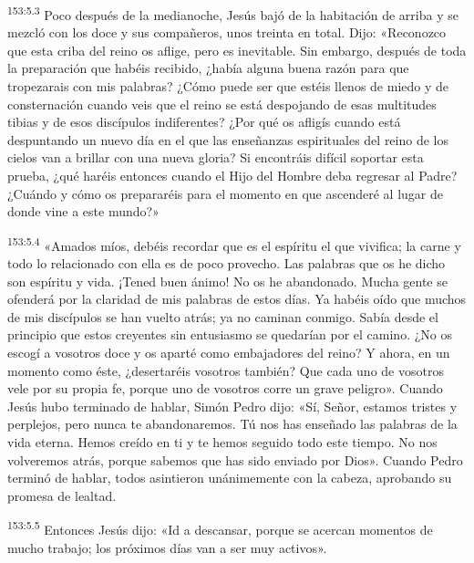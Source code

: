 \par 
\textsuperscript{153:5.3} Poco después de la medianoche, Jesús bajó de la habitación de arriba y se mezcló con los doce y sus compañeros, unos treinta en total. Dijo: «Reconozco que esta criba del reino os aflige, pero es inevitable. Sin embargo, después de toda la preparación que habéis recibido, ¿había alguna buena razón para que tropezarais con mis palabras? ¿Cómo puede ser que estéis llenos de miedo y de consternación cuando veis que el reino se está despojando de esas multitudes tibias y de esos discípulos indiferentes? ¿Por qué os afligís cuando está despuntando un nuevo día en el que las enseñanzas espirituales del reino de los cielos van a brillar con una nueva gloria? Si encontráis difícil soportar esta prueba, ¿qué haréis entonces cuando el Hijo del Hombre deba regresar al Padre? ¿Cuándo y cómo os prepararéis para el momento en que ascenderé al lugar de donde vine a este mundo?»

\par 
\textsuperscript{153:5.4} «Amados míos, debéis recordar que es el espíritu el que vivifica; la carne y todo lo relacionado con ella es de poco provecho. Las palabras que os he dicho son espíritu y vida. ¡Tened buen ánimo! No os he abandonado. Mucha gente se ofenderá por la claridad de mis palabras de estos días. Ya habéis oído que muchos de mis discípulos se han vuelto atrás; ya no caminan conmigo. Sabía desde el principio que estos creyentes sin entusiasmo se quedarían por el camino. ¿No os escogí a vosotros doce y os aparté como embajadores del reino? Y ahora, en un momento como éste, ¿desertaréis vosotros también? Que cada uno de vosotros vele por su propia fe, porque uno de vosotros corre un grave peligro». Cuando Jesús hubo terminado de hablar, Simón Pedro dijo: «Sí, Señor, estamos tristes y perplejos, pero nunca te abandonaremos. Tú nos has enseñado las palabras de la vida eterna. Hemos creído en ti y te hemos seguido todo este tiempo. No nos volveremos atrás, porque sabemos que has sido enviado por Dios». Cuando Pedro terminó de hablar, todos asintieron unánimemente con la cabeza, aprobando su promesa de lealtad.

\par 
\textsuperscript{153:5.5} Entonces Jesús dijo: «Id a descansar, porque se acercan momentos de mucho trabajo; los próximos días van a ser muy activos».